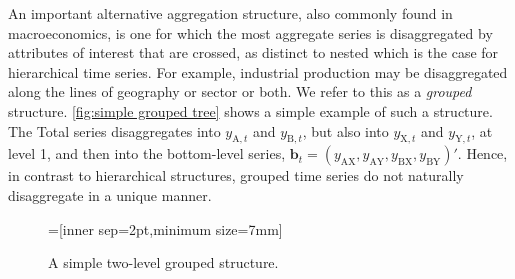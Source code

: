 \documentclass[graybox]{svmult}
\begin{document}
An important alternative aggregation structure, also commonly found in macroeconomics, is one for which the most aggregate series is disaggregated by attributes of interest that are crossed, as distinct to nested which is the case for hierarchical time series. For example, industrial production may be disaggregated along the lines of geography or sector or both. We refer to this as a \textit{grouped} structure. \autoref{fig:simple grouped tree} shows a simple example of such a structure. The Total series disaggregates into $y_{\text{A},t}$ and $y_{\text{B},t}$, but also into $y_{\text{X},t}$ and $y_{\text{Y},t}$, at level 1, and then into the bottom-level series, $\bm{b}_t=(y_{\text{AX}}, y_{\text{AY}}, y_{\text{BX}}, y_{\text{BY}})'$. Hence, in contrast to hierarchical structures, grouped time series do not naturally disaggregate in a unique manner.

\begin{figure}[!hbt]\sidecaption\centering
	=[inner sep=2pt,minimum size=7mm]
	\caption{A simple two-level grouped structure.}
	\label{fig:simple grouped tree}
\end{figure}
\end{document}
